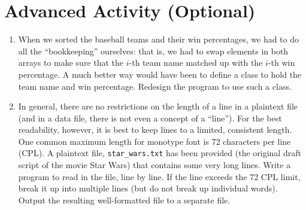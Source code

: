 \documentclass[12pt]{scrartcl}
\begin{document}
\section{Advanced Activity (Optional)}

\begin{enumerate}
  \item When we sorted the baseball teams and their win percentages, we had 
  	to do all the ``bookkeeping'' ourselves: that is, we had to swap elements 
	in both arrays to make sure that the $i$-th team name matched up with the 
	$i$-th win percentage.  A much better way would have been to define a 
	class to hold the team name and win percentage.  Redesign the program to 
	use such a class.
  \item In general, there are no restrictions on the length of a line in a plaintext 
	file (and in a data file, there is not even a concept of a ``line'').  For the best 
	readability, however, it is best to keep lines to a limited, consistent length.  
	One common maximum length for monotype font is 72 characters per 
	line (CPL).  A plaintext file, \texttt{star_wars.txt} has been provided (the 
	original draft script of the movie Star Wars) that contains some very long 
	lines.  Write a program to read in the file, line by line.  If the line exceeds 
	the 72 CPL limit, break it up into multiple lines (but do not break up individual 
	words).  Output the resulting well-formatted file to a separate file.
\end{enumerate}
\end{document}
